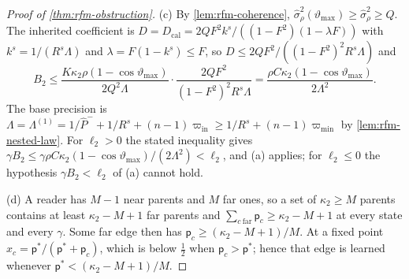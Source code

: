\begin{proof}[Proof of \cref{thm:rfm-obstruction}]
(c) By \cref{lem:rfm-coherence}, $\hat\sigma_\rho^2(\vartheta_{\max})\ge\hat\sigma^2_\rho\ge Q$. The inherited coefficient is $D=D_{\mathrm{cal}}=2QF^2k^s/((1-F^2)(1-\lambda F))$ with $k^s=1/(R^s\Lambda)$ and $\lambda=F(1-k^s)\le F$, so $D\le2QF^2/((1-F^2)^2R^s\Lambda)$ and
\begin{equation*}
B_2\le\frac{K\kappa_2\rho(1-\cos\vartheta_{\max})}{2Q^2\Lambda}\cdot\frac{2QF^2}{(1-F^2)^2R^s\Lambda}=\frac{\rho C\kappa_2(1-\cos\vartheta_{\max})}{2\Lambda^2}.
\end{equation*}
The base precision is $\Lambda=\Lambda^{(1)}=1/\hat P^-+1/R^s+(n-1)\varpi_{\mathrm{in}}\ge1/R^s+(n-1)\varpi_{\min}$ by \cref{lem:rfm-nested-law}. For $\ell_2>0$ the stated inequality gives $\gamma B_2\le\gamma\rho C\kappa_2(1-\cos\vartheta_{\max})/(2\Lambda^2)<\ell_2$, and (a) applies; for $\ell_2\le0$ the hypothesis $\gamma B_2<\ell_2$ of (a) cannot hold.

(d) A reader has $M-1$ near parents and $M$ far ones, so a set of $\kappa_2\ge M$ parents contains at least $\kappa_2-M+1$ far parents and $\sum_{c\ \mathrm{far}}\mathsf p_c\ge\kappa_2-M+1$ at every state and every $\gamma$. Some far edge then has $\mathsf p_c\ge(\kappa_2-M+1)/M$. At a fixed point $x_c=\mathsf p^\ast/(\mathsf p^\ast+\mathsf p_c)$, which is below $\frac12$ when $\mathsf p_c>\mathsf p^\ast$; hence that edge is learned whenever $\mathsf p^\ast<(\kappa_2-M+1)/M$.
\end{proof}

